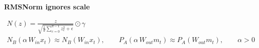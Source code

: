 \documentclass[border=40pt]{standalone}
\begin{document}
\begin{minipage}{26cm}
{\sffamily\bfseries\Large\color{muted} RMSNorm ignores scale}\par\vspace{-14pt}
{\LARGE
\begin{gather*}
N(z) = \frac{z}{\sqrt{\frac{1}{d}\sum_{c=0}^{d-1} z_c^{2} + \epsilon}} \odot \gamma
\\[6pt]
N_B(\alpha\,W_{in}x_t) \approx N_B(W_{in}x_t), \qquad P_A(\alpha\,W_{out}m_t) \approx P_A(W_{out}m_t), \qquad \alpha > 0
\end{gather*}}
\end{minipage}
\end{document}
